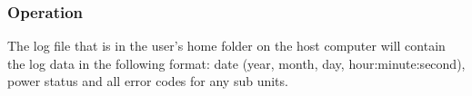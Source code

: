 \subsubsection{Operation}
The log file that is in the user's home folder on the host computer will contain the log data in the following format: date (year, month, day, hour:minute:second), power status and all error codes for any sub units.

